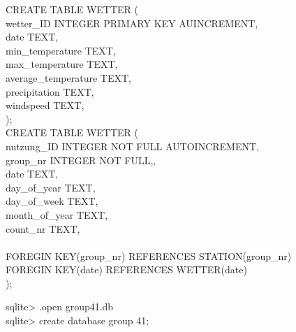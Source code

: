 \documentclass{article}
\begin{document}
CREATE TABLE  WETTER ( \\ \indent
\hspace{1cm} wetter\_ID INTEGER PRIMARY KEY AUINCREMENT, \\ \indent
\hspace{1cm} date TEXT, \\ \indent
\hspace{1cm} min\_temperature TEXT, \\ \indent 
\hspace{1cm} max\_temperature TEXT, \\ \indent
\hspace{1cm} average\_temperature TEXT, \\ \indent
\hspace{1cm} precipitation TEXT, \\ \indent
\hspace{1cm} windspeed TEXT, \\ \indent
); \\

CREATE TABLE  WETTER ( \\ \indent
\hspace{1cm} nutzung\_ID INTEGER NOT FULL AUTOINCREMENT, \\ \indent
\hspace{1cm} group\_nr INTEGER NOT FULL,, \\ \indent
\hspace{1cm} date TEXT, \\ \indent 
\hspace{1cm} day\_of\_year TEXT, \\ \indent
\hspace{1cm} day\_of\_week TEXT, \\ \indent
\hspace{1cm} month\_of\_year TEXT, \\ \indent
\hspace{1cm} count\_nr TEXT, \\ \indent
\\ \indent
\hspace{2.5cm} FOREGIN KEY(group\_nr) REFERENCES STATION(group\_nr) \\ \indent
\hspace{2.5cm} FOREGIN KEY(date) REFERENCES WETTER(date)\\ \indent
); \\ \indent

\newpage




sqlite> .open group41.db \\ \indent
sqlite> create database group 41; \\ \indent
\end{document}
